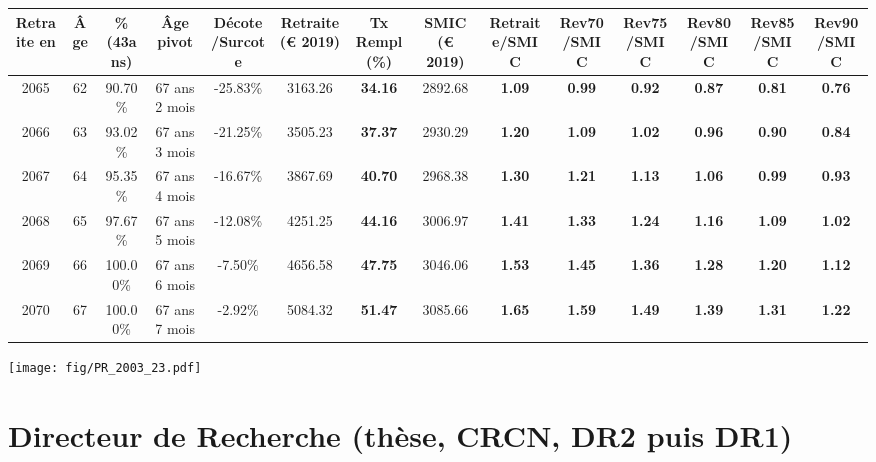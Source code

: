 \begin{adjustbox}{max width=\textwidth} 
\begin{tabular}[htb]{|c|c||c|c|c||c|c||c||c|c|c|c|c|c|} 
\hline 
 Retraite en &  Âge &  \%(43ans) &  Âge pivot &  Décote/Surcote &  Retraite (\euro{} 2019) &  Tx Rempl(\%) &  SMIC (\euro{} 2019) &  Retraite/SMIC &  Rev70/SMIC &  Rev75/SMIC &  Rev80/SMIC &  Rev85/SMIC &  Rev90/SMIC \\ 
\hline \hline 
 2065 &  62 &  90.70\% &  67 ans 2 mois &  -25.83\% &  3163.26 &  {\bf 34.16} &  2892.68 &  {\bf 1.09} &  {\bf {\color{red} 0.99}} &  {\bf {\color{red} 0.92}} &  {\bf {\color{red} 0.87}} &  {\bf {\color{red} 0.81}} &  {\bf {\color{red} 0.76}} \\ 
\hline 
 2066 &  63 &  93.02\% &  67 ans 3 mois &  -21.25\% &  3505.23 &  {\bf 37.37} &  2930.29 &  {\bf 1.20} &  {\bf 1.09} &  {\bf 1.02} &  {\bf {\color{red} 0.96}} &  {\bf {\color{red} 0.90}} &  {\bf {\color{red} 0.84}} \\ 
\hline 
 2067 &  64 &  95.35\% &  67 ans 4 mois &  -16.67\% &  3867.69 &  {\bf 40.70} &  2968.38 &  {\bf 1.30} &  {\bf 1.21} &  {\bf 1.13} &  {\bf 1.06} &  {\bf {\color{red} 0.99}} &  {\bf {\color{red} 0.93}} \\ 
\hline 
 2068 &  65 &  97.67\% &  67 ans 5 mois &  -12.08\% &  4251.25 &  {\bf 44.16} &  3006.97 &  {\bf 1.41} &  {\bf 1.33} &  {\bf 1.24} &  {\bf 1.16} &  {\bf 1.09} &  {\bf 1.02} \\ 
\hline 
 2069 &  66 &  100.00\% &  67 ans 6 mois &  -7.50\% &  4656.58 &  {\bf 47.75} &  3046.06 &  {\bf 1.53} &  {\bf 1.45} &  {\bf 1.36} &  {\bf 1.28} &  {\bf 1.20} &  {\bf 1.12} \\ 
\hline 
 2070 &  67 &  100.00\% &  67 ans 7 mois &  -2.92\% &  5084.32 &  {\bf 51.47} &  3085.66 &  {\bf 1.65} &  {\bf 1.59} &  {\bf 1.49} &  {\bf 1.39} &  {\bf 1.31} &  {\bf 1.22} \\ 
\hline 
\hline 
\end{tabular} 
\end{adjustbox} 
 
 \vspace{0.1cm} 

 \begin{center}\texttt{[image: fig/PR\_2003\_23.pdf]}\end{center} \label{fig/PR_2003_23.pdf} 

\newpage 
 
\chapter{Directeur de Recherche (thèse, CRCN, DR2 puis DR1)} 

